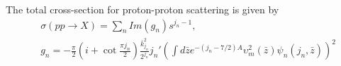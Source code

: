 \documentclass[preprint, 12pt]{elsarticle}
\begin{document}
The total cross-section for proton-proton scattering is given by
\begin{align}
&\sigma\left(p p \rightarrow X\right) = \sum_n Im \left(g_n\right) s^{j_n - 1} , \\
&g_n = - \frac{\pi}{2} \left( i + \cot \frac{\pi j_n}{2} \right) \frac{\bar{k}^2_{j_n}}{2^{j_n}} j_n' {\left( \int d\bar{z} e^{- \left(j_n - 7/2\right) A} \upsilon_m^2\left(\bar{z}\right) \psi_n \left(j_n, \bar{z}\right) \right)}^2
\end{align}









































\end{document}
